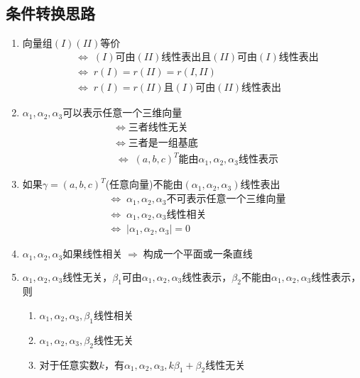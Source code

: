 \documentclass[a4paper,12pt]{article}
\begin{document}
    \subsection{条件转换思路}

    \begin{enumerate}
        \item $\text{向量组}(I)(II)\text{等价}$
        \begin{align*}
            &\Leftrightarrow\; (I)\text{可由}(II)\text{线性表出}\text{且}(II)\text{可由}(I)\text{线性表出} \\
            &\Leftrightarrow\; r(I) = r(II) = r(I, II) \\
            &\Leftrightarrow\; r(I) = r(II)\text{且}(I)\text{可由}(II)\text{线性表出}
        \end{align*}
        \item $\alpha_1, \alpha_2, \alpha_3$可以表示任意一个三维向量
        \begin{align*}
            &\Leftrightarrow\; \text{三者线性无关}  \\
            &\Leftrightarrow\; \text{三者是一组基底}  \\
            &\Leftrightarrow\; (a, b, c)^T\text{能由}\alpha_1, \alpha_2, \alpha_3\text{线性表示}
        \end{align*}
        \item 如果$\gamma = (a, b, c)^T$(任意向量)不能由$(\alpha_1, \alpha_2, \alpha_3)$线性表出
        \begin{align*}
            &\Leftrightarrow\; \alpha_1, \alpha_2, \alpha_3\text{不可表示任意一个三维向量}  \\
            &\Leftrightarrow\; \alpha_1, \alpha_2, \alpha_3\text{线性相关}  \\
            &\Leftrightarrow\; |\alpha_1, \alpha_2, \alpha_3| = 0
        \end{align*}
        \item $\alpha_1, \alpha_2, \alpha_3\text{如果线性相关} \;\Rightarrow\; \text{构成一个平面或一条直线}$
        \item $\alpha_1, \alpha_2, \alpha_3$线性无关，$\beta_1$可由$\alpha_1, \alpha_2, \alpha_3$线性表示，$\beta_2$不能由$\alpha_1, \alpha_2, \alpha_3$线性表示，则
        \begin{enumerate}
            \item $\alpha_1, \alpha_2, \alpha_3, \beta_1$线性相关
            \item $\alpha_1, \alpha_2, \alpha_3, \beta_2$线性无关
            \item 对于任意实数$k$，有$\alpha_1, \alpha_2, \alpha_3, k\beta_1 + \beta_2$线性无关

\end{enumerate}
\end{enumerate}
\end{document}
